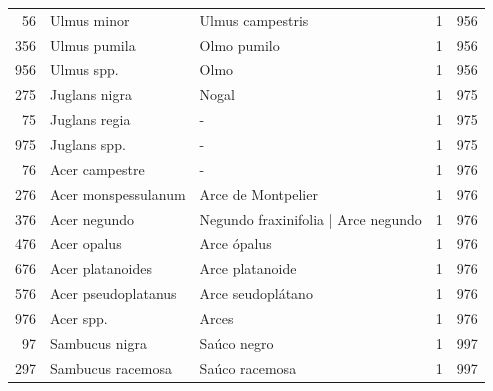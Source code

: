 \begin{longtable}{r p{4cm} p{5cm} c c}
    56            & Ulmus minor                       & Ulmus campestris                              & 1             & 956            \\
    356           & Ulmus pumila                      & Olmo pumilo                                   & 1             & 956            \\
    956           & Ulmus spp.                        & Olmo                                          & 1             & 956            \\
    275           & Juglans nigra                     & Nogal                                         & 1             & 975            \\
    75            & Juglans regia                     & -                                             & 1             & 975            \\
    975           & Juglans spp.                      & -                                             & 1             & 975            \\
    76            & Acer campestre                    & -                                             & 1             & 976            \\
    276           & Acer monspessulanum               & Arce de Montpelier                            & 1             & 976            \\
    376           & Acer negundo                      & Negundo fraxinifolia | Arce negundo           & 1             & 976            \\
    476           & Acer opalus                       & Arce ópalus                                   & 1             & 976            \\
    676           & Acer platanoides                  & Arce platanoide                               & 1             & 976            \\
    576           & Acer pseudoplatanus               & Arce seudoplátano                             & 1             & 976            \\
    976           & Acer spp.                         & Arces                                         & 1             & 976            \\
    97            & Sambucus nigra                    & Saúco negro                                   & 1             & 997            \\
    297           & Sambucus racemosa                 & Saúco racemosa                                & 1             & 997            \\

\end{longtable}

